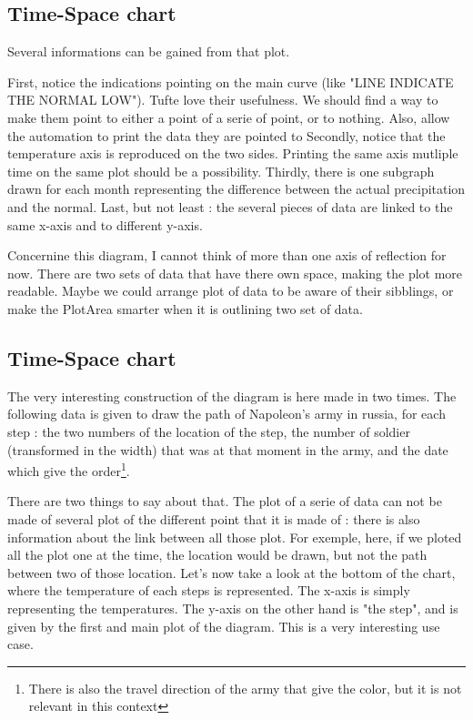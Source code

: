 \subsection{Time-Space chart}
Several informations can be gained from that plot.

First, notice the indications pointing on the main curve (like "LINE INDICATE THE NORMAL LOW"). Tufte love their usefulness. We should find a way to make them point to either a point of a serie of point, or to nothing. Also, allow the automation to print the data they are pointed to
Secondly, notice that the temperature axis is reproduced on the two sides. Printing the same axis mutliple time on the same plot should be a possibility. 
Thirdly, there is one subgraph drawn for each month representing the difference between the actual precipitation and the normal.
Last, but not least : the several pieces of data are linked to the same x-axis and to different y-axis.

Concernine this diagram, I cannot think of more than one axis of reflection for now. There are two sets of data that have there own space, making the plot more readable. Maybe we could arrange plot of data to be aware of their sibblings, or make the PlotArea smarter when it is outlining two set of data.


\subsection{Time-Space chart}
The very interesting construction of the diagram is here made in two times. The following data is given to draw the path of Napoleon's army in russia, for each step : the two numbers of the location of the step, the number of soldier (transformed in the width) that was at that moment in the army, and the date which give the order\footnote{There is also the travel direction of the army that give the color, but it is not relevant in this context}.

There are two things to say about that. The plot of a serie of data can not be made of several plot of the different point that it is made of : there is also information about the link between all those plot. For exemple, here, if we ploted all the plot one at the time, the location would be drawn, but not the path between two of those location.
Let's now take a look at the bottom of the chart, where the temperature of each steps is represented. The x-axis is simply representing the temperatures. The y-axis on the other hand is "the step", and is given by the first and main plot of the diagram. This is a very interesting use case.

